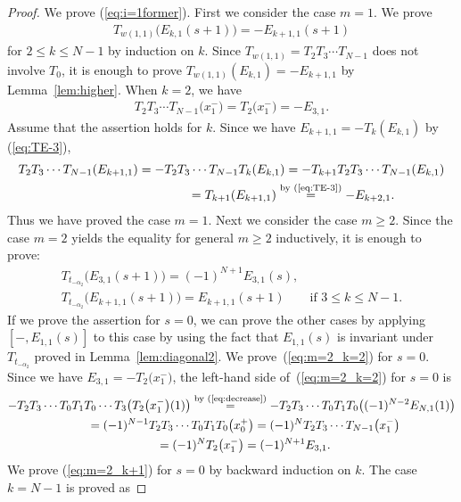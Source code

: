 \begin{proof}
We prove (\ref{eq:i=1former}). First we consider the case $m=1$. We prove
\begin{gather*}
T_{w(1,1)} \big(E_{k,1}(s+1)\big)=-E_{k+1,1}(s+1)
\end{gather*}
for $2 \leq k \leq N-1$ by induction on $k$. Since $T_{w(1,1)}=T_2 T_3 \cdots T_{N-1}$ does not involve $T_0$, it is enough to prove $T_{w(1,1)}(E_{k,1})=-E_{k+1,1}$ by Lemma~\ref{lem:higher}. When $k=2$, we have
\begin{gather*}
T_2 T_3 \cdots T_{N-1}\big(x_1^-\big) = T_2\big(x_1^-\big) = -E_{3,1}.
\end{gather*}
Assume that the assertion holds for $k$. Since we have $E_{k+1,1}=-T_k(E_{k,1})$ by (\ref{eq:TE-3}),
\begin{gather*}
T_2 T_3 \cdots T_{N-1}(E_{k+1,1}) = -T_2 T_3 \cdots T_{N-1} T_k(E_{k,1}) = -T_{k+1} T_2 T_3 \cdots T_{N-1} (E_{k,1})\\
\hphantom{T_2 T_3 \cdots T_{N-1}(E_{k+1,1})}{} = T_{k+1}(E_{k+1,1}) \overset{\text{by (\ref{eq:TE-3})}}{=} -E_{k+2,1}.
\end{gather*}
Thus we have proved the case $m=1$. Next we consider the case $m \geq 2$. Since the case $m=2$ yields the equality for general $m \geq 2$ inductively, it is enough to prove:
\begin{gather}
T_{t_{-\alpha_2}}\big(E_{3,1}(s+1)\big) = (-1)^{N+1}E_{3,1}(s), \label{eq:m=2_k=2}\\
T_{t_{-\alpha_2}}\big(E_{k+1,1}(s+1)\big) = E_{k+1,1}(s+1) \qquad \text{if $3 \leq k \leq N-1$}. \label{eq:m=2_k+1}
\end{gather}
If we prove the assertion for $s=0$, we can prove the other cases by applying $[-,E_{1,1}(s)]$ to this case by using the fact that $E_{1,1}(s)$ is invariant under $T_{t_{-\alpha_2}}$ proved in Lemma~\ref{lem:diagonal2}.
We prove~(\ref{eq:m=2_k=2}) for $s=0$. Since we have $E_{3,1}=-T_2\big(x_1^-\big)$, the left-hand side of~(\ref{eq:m=2_k=2}) for $s=0$ is
\begin{gather*}
-T_2 T_3 \cdots T_0 T_1 T_0 \cdots T_3 \big(T_2 \big(x_1^-\big)(1)\big) \overset{\text{by (\ref{eq:decrease})}}{=} -T_2 T_3 \cdots T_0 T_1 T_0\big( (-1)^{N-2} E_{N,1}(1) \big) \\
\qquad {} = (-1)^{N-1} T_2 T_3 \cdots T_0 T_1 T_0 \big(x_0^+\big) = (-1)^N T_2 T_3 \cdots T_{N-1} \big(x_1^-\big) \\
\qquad{} = (-1)^N T_2\big(x_1^-\big) = (-1)^{N+1} E_{3,1}.
\end{gather*}
We prove (\ref{eq:m=2_k+1}) for $s=0$ by backward induction on $k$. The case $k=N-1$ is proved as

\end{proof}

